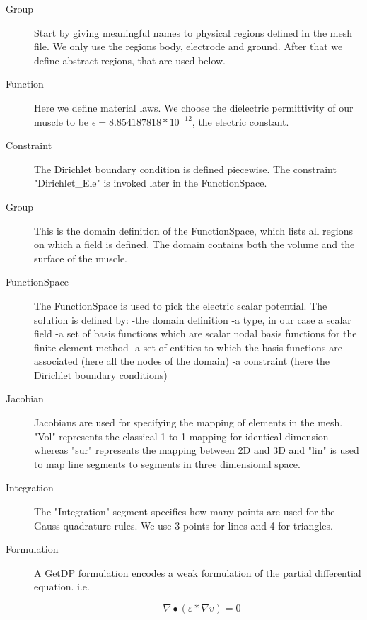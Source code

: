\documentclass[preprint,journal]{vgtc}       %
\begin{document}
\begin{description}
	\item[Group]
	Start by giving meaningful names to physical regions defined in the mesh file.
	We only use the regions body, electrode and ground. 
	After that we define abstract regions, that are used below.
	\item[Function]
	Here we define material laws.
	We choose the dielectric permittivity of our muscle to be $\epsilon = 8.854187818 *10^{-12}$, the electric constant.
	\item[Constraint]
	The Dirichlet boundary condition is defined piecewise. 
	The constraint "Dirichlet\_Ele" is invoked later in the FunctionSpace.
	\item[Group]
	This is the domain definition of the FunctionSpace, which lists all regions on which a field is defined. 
	The domain contains both the volume and the surface of the muscle.
	\item[FunctionSpace]
	The FunctionSpace is used to pick the electric scalar potential. 
	The solution is defined  by:\newline
	-the domain definition\newline
	-a type, in our case a scalar field\newline
	-a set of basis functions which are scalar nodal basis functions for the finite element method\newline 
	-a set of entities to which the basis functions are associated (here all the nodes of the domain)\newline
	-a constraint (here the Dirichlet boundary conditions)
	
	\item[Jacobian] 
	Jacobians are used for specifying the mapping of elements in the mesh.
	"Vol" represents the classical 1-to-1 mapping for identical dimension whereas "sur" represents the mapping between 2D and 3D and "lin" is used to map line segments to segments in three dimensional space.
	
	\item[Integration]
	The "Integration" segment specifies how many points are used for the Gauss quadrature rules. 
	We use 3 points for lines and 4 for triangles.
	
	\item[Formulation]
	A GetDP formulation encodes a weak formulation of the partial differential equation. i.e. 
	
	
	\[-\nabla \bullet (\varepsilon *\nabla v) = 0\]
	

\end{description}
\end{document}
